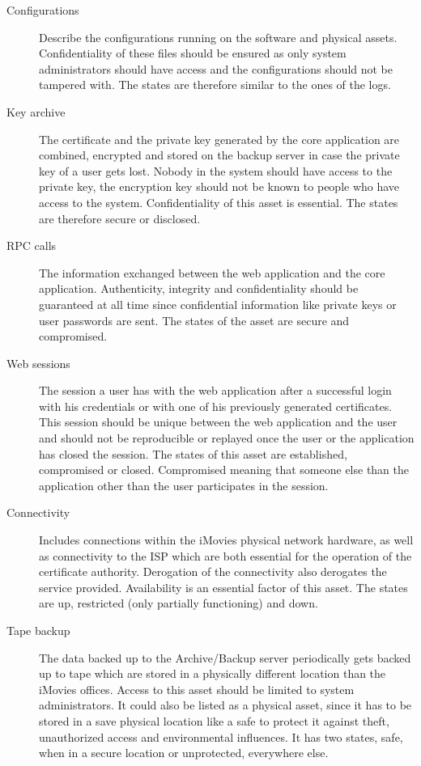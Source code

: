 \documentclass[a4paper, toc=index, 12pt, DIV14, twoside, BCOR2cm, headsepline, numbers=noenddot, bibliography=totoc]{scrbook}
\begin{document}
\begin{description}
\item[Configurations ] Describe the configurations running on the software and physical assets. Confidentiality of these files should be ensured as only system administrators should have access and the configurations should not be tampered with. The states are therefore similar to the ones of the logs.
\item[Key archive ] The certificate and the private key generated by the core application are combined, encrypted and stored on the backup server in case the private key of a user gets lost. Nobody in the system should have access to the private key, the encryption key should not be known to people who have access to the system. Confidentiality of this asset is essential. The states are therefore secure or disclosed.
\item[RPC calls ] The information exchanged between the web application and the core application. Authenticity, integrity and confidentiality should be guaranteed at all time since confidential information like private keys or user passwords are sent. The states of the asset are secure and compromised.
\item[Web sessions ] The session a user has with the web application after a successful login with his credentials or with one of his previously generated certificates. This session should be unique between the web application and the user and should not be reproducible or replayed once the user or the application has closed the session. The states of this asset are established, compromised or closed. Compromised meaning that someone else than the application other than the user participates in the session.
\item[Connectivity ] Includes connections within the iMovies physical network hardware, as well as connectivity to the ISP which are both essential for the operation of the certificate authority. Derogation of the connectivity also derogates the service provided. Availability is an essential factor of this asset. The states are up, restricted (only partially functioning) and down.
\item[Tape backup ] The data backed up to the Archive/Backup server periodically gets backed up to tape which are stored in a physically different location than the iMovies offices. Access to this asset should be limited to system administrators. It could also be listed as a physical asset, since it has to be stored in a save physical location like a safe to protect it against theft, unauthorized access and environmental influences. It has two states, safe, when in a secure location or unprotected, everywhere else.

\end{description}
\end{document}
